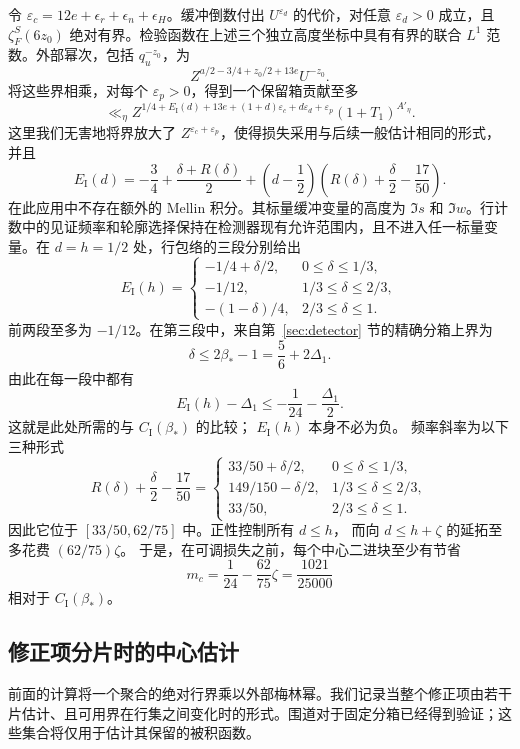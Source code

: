 \documentclass[11pt,a4paper]{article}
\numberwithin{equation}{section}
\numberwithin{figure}{section}
\theoremstyle{definition}
\theoremstyle{remark}
\begin{document}
令 $\varepsilon_c=12e+\epsilon_r+\epsilon_n+\epsilon_H$。缓冲倒数付出 $U^{\varepsilon_d}$ 的代价，对任意 $\varepsilon_d>0$ 成立，且 $\zeta_F^S(6z_0)$ 绝对有界。检验函数在上述三个独立高度坐标中具有有界的联合 $L^1$ 范数。外部幂次，包括 $q_u^{-z_0}$，为
\[
 Z^{a/2-3/4+z_0/2+13e}U^{-z_0}.
\]
将这些界相乘，对每个 $\varepsilon_p>0$，得到一个保留箱贡献至多
\begin{equation}
 \ll_\eta Z^{1/4+E_{\mathrm I}(d)+13e
       +(1+d)\varepsilon_c+d\varepsilon_d+\varepsilon_p}
 (1+T_1)^{A'_\eta}.
 \label{eq:balanced-central-contribution}
\end{equation}
这里我们无害地将界放大了 $Z^{\varepsilon_c+\varepsilon_p}$，使得损失采用与后续一般估计相同的形式，并且
\[
 E_{\mathrm I}(d)=-\frac34+\frac{\delta+R(\delta)}2
 +\left(d-\frac12\right)
       \left(R(\delta)+\frac\delta2-\frac{17}{50}\right).
\]
在此应用中不存在额外的 Mellin 积分。其标量缓冲变量的高度为 $\Im s$ 和 $\Im w$。行计数中的见证频率和轮廓选择保持在检测器现有允许范围内，且不进入任一标量变量。在 $d=h=1/2$ 处，行包络的三段分别给出
\[
 E_{\mathrm I}(h)=
 \begin{cases}
  -1/4+\delta/2,&0\le\delta\le1/3,\\
  -1/12,&1/3\le\delta\le2/3,\\
  -(1-\delta)/4,&2/3\le\delta\le1.
 \end{cases}
\]
前两段至多为 $-1/12$。在第三段中，来自第~\ref{sec:detector} 节的精确分箱上界为
\[
 \delta\le2\beta_*-1=\frac56+2\Delta_1.
\]
由此在每一段中都有
\[
 E_{\mathrm I}(h)-\Delta_1
 \le-\frac1{24}-\frac{\Delta_1}{2}.
\]
这就是此处所需的与 $C_{\mathrm I}(\beta_*)$ 的比较；
$E_{\mathrm I}(h)$ 本身不必为负。
频率斜率为以下三种形式
\[
 R(\delta)+\frac\delta2-\frac{17}{50}
 =\begin{cases}
  33/50+\delta/2,&0\le\delta\le1/3,\\
  149/150-\delta/2,&1/3\le\delta\le2/3,\\
  33/50,&2/3\le\delta\le1.
 \end{cases}
\]
因此它位于 $[33/50,62/75]$ 中。正性控制所有 $d\le h$，
而向 $d\le h+\zeta$ 的延拓至多花费 $(62/75)\zeta$。
于是，在可调损失之前，每个中心二进块至少有节省
\[
 m_c=\frac1{24}-\frac{62}{75}\zeta=\frac{1021}{25000}
\]
相对于 $C_{\mathrm I}(\beta_*)$。

\subsection{修正项分片时的中心估计}

前面的计算将一个聚合的绝对行界乘以外部梅林幂。我们记录当整个修正项由若干片估计、且可用界在行集之间变化时的形式。围道对于固定分箱已经得到验证；这些集合将仅用于估计其保留的被积函数。
\end{document}
